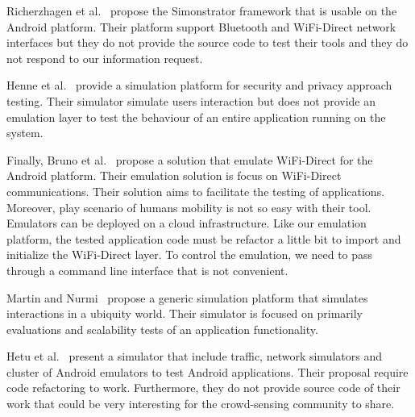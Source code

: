 Richerzhagen et al.~\cite{DBLP:conf/simutools/RicherzhagenSRS15} propose the Simonstrator framework that is usable on the Android platform.
Their platform support Bluetooth and WiFi-Direct network interfaces but they do not provide the source code to test their tools and they do not respond to our information request.

Henne et al.~\cite{henne2011towards} provide a simulation platform for security and privacy approach testing. 
Their simulator simulate users interaction but does not provide an emulation layer to test the behaviour of an entire application running on the system.


Finally, Bruno et al.~\cite{DBLP:journals/amsys/Bruno0F15} propose a solution that emulate WiFi-Direct for the Android platform.
Their emulation solution is focus on WiFi-Direct communications.
Their solution aims to facilitate the testing of applications.
Moreover, play scenario of humans mobility is not so easy with their tool.
Emulators can be deployed on a cloud infrastructure.
Like our emulation platform, the tested application code must be refactor a little bit to import and initialize the WiFi-Direct layer.
To control the emulation, we need to pass through a command line interface that is not convenient.



Martin and Nurmi~\cite{DBLP:conf/mobiquitous/MartinN06} propose a generic simulation platform that simulates interactions in a ubiquity world.
Their simulator is focused on primarily evaluations and scalability tests of an application functionality.

Hetu et al.~\cite{DBLP:conf/vtc/HetuHP14} present a simulator that include traffic, network simulators and cluster of Android emulators to test Android applications.
Their proposal require code refactoring to work.
Furthermore, they do not provide source code of their work that could be very interesting for the crowd-sensing community to share.